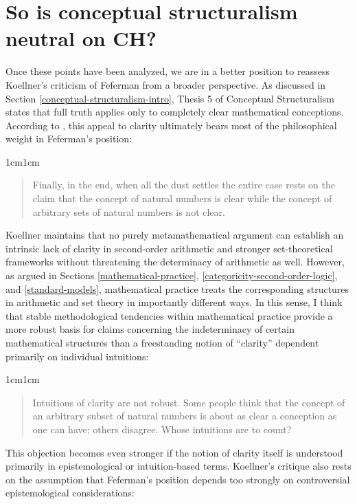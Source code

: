 \documentclass[11pt,a4paper]{article}
\theoremstyle{plain}
\begin{document}
\section{So is conceptual structuralism neutral on CH?}
\label{conclusion-Koellner-clarity}

Once these points have been analyzed, we are in a better position to reassess Koellner's criticism of Feferman from a broader perspective. As discussed in Section \ref{conceptual-structuralism-intro}, Thesis 5 of Conceptual Structuralism states that full truth applies only to completely clear mathematical conceptions. According to \textcite[15]{Koellner2022}, this appeal to clarity ultimately bears most of the philosophical weight in Feferman's position:

\begin{adjustwidth}{1cm}{1cm}
\begin{quote}
\small
Finally, in the end, when all the dust settles the entire case rests on the claim that the concept of natural numbers is clear while the concept of arbitrary sets of natural numbers is not clear.
\end{quote}
\end{adjustwidth}

Koellner maintains that no purely metamathematical argument can establish an intrinsic lack of clarity in second-order arithmetic and stronger set-theoretical frameworks without threatening the determinacy of arithmetic as well. However, as argued in Sections \ref{mathematical-practice}, \ref{categoricity-second-order-logic}, and \ref{standard-models}, mathematical practice treats the corresponding structures in arithmetic and set theory in importantly different ways. In this sense, I think that stable methodological tendencies within mathematical practice provide a more robust basis for claims concerning the indeterminacy of certain mathematical structures than a freestanding notion of ``clarity'' dependent primarily on individual intuitions:

\begin{adjustwidth}{1cm}{1cm}
\begin{quote}
\small
Intuitions of clarity are not robust. Some people think that the concept of an arbitrary subset of natural numbers is about as clear a conception as one can have; others disagree. Whose intuitions are to count? \parencite[14]{Koellner2022}
\end{quote}
\end{adjustwidth}

This objection becomes even stronger if the notion of clarity itself is understood primarily in epistemological or intuition-based terms. Koellner's critique also rests on the assumption that Feferman's position depends too strongly on controversial epistemological considerations:
\end{document}
